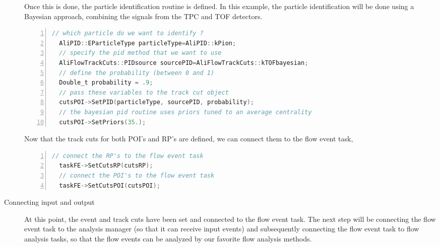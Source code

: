 \documentclass[a4paper]{book}
\numberwithin{equation}{subsection}
\begin{document}
\begin{description}
Once this is done, the particle identification routine is defined. In this example, the particle identification will be done using a Bayesian approach, combining the signals from the TPC and TOF detectors. 
\begin{lstlisting}[language=C, numbers=left]
  // which particle do we want to identify ?
  AliPID::EParticleType particleType=AliPID::kPion;
  // specify the pid method that we want to use  
  AliFlowTrackCuts::PIDsource sourcePID=AliFlowTrackCuts::kTOFbayesian;
  // define the probability (between 0 and 1) 
  Double_t probability = .9;
  // pass these variables to the track cut object
  cutsPOI->SetPID(particleType, sourcePID, probability);
  // the bayesian pid routine uses priors tuned to an average centrality
  cutsPOI->SetPriors(35.);\end{lstlisting}
  
Now that the track cuts for both POI's and RP's are defined, we can connect them to the flow event task,
\begin{lstlisting}[language=C, numbers=left]
  // connect the RP's to the flow event task
  taskFE->SetCutsRP(cutsRP);
  // connect the POI's to the flow event task
  taskFE->SetCutsPOI(cutsPOI);\end{lstlisting}
  
  \item [Connecting input and output]
  At this point, the event and track cuts have been set and connected to the flow event task. The next step will be connecting the flow event task to the analysis manager (so that it can receive input events) and subsequently connecting the flow event task to flow analysis tasks, so that the flow events can be analyzed by our favorite flow analysis methods. 
  

\end{description}
\end{document}
